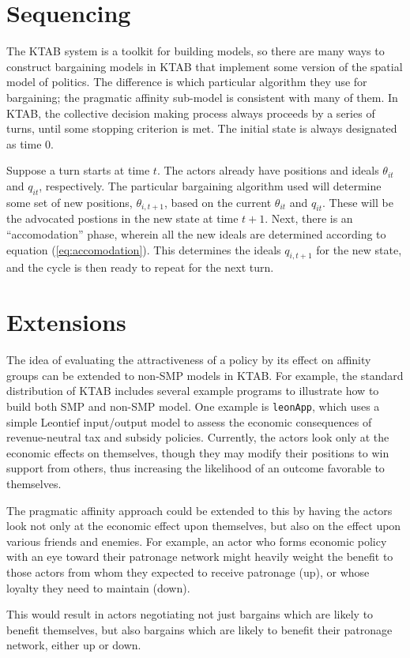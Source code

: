 \documentclass[a4paper,10pt]{article}
\begin{document}
\section{Sequencing}
The KTAB system is a toolkit for building models, so there are many ways to construct bargaining
models in KTAB that implement some version of the spatial model of politics. The difference is 
which particular algorithm they use for bargaining;
the pragmatic affinity sub-model is consistent with many of them. In KTAB,
the collective decision making process always proceeds by a series of turns, until some stopping
criterion is met. The initial state is always designated as time 0.

Suppose a turn starts at time $t$. The actors already have positions and ideals $\theta_{it}$
and $q_{it}$, respectively. The particular bargaining algorithm used will 
determine some set of new positions, $\theta_{i,t+1}$,
 based on the current  $\theta_{it}$
and $q_{it}$. These will be the advocated postions in the new state at time $t+1$.
Next, there is an ``accomodation'' phase, wherein all the new ideals are determined
according to equation (\ref{eq:accomodation}). This determines the ideals $q_{i,t+1}$ for the new state,
and the cycle is then ready to repeat for the next turn.

  
\section{Extensions}

The idea of evaluating the attractiveness of a policy by its effect on affinity groups can be extended to
non-SMP models in KTAB. For example, the standard distribution of KTAB includes several example programs
to illustrate how to build both SMP and non-SMP model. 
One example is \mbox{\texttt{leonApp}}, which  uses a simple Leontief input/output 
model to assess the economic consequences of revenue-neutral tax and subsidy policies.
Currently, the actors look only at the economic effects on themselves, though they may modify their positions
to win support from others, thus increasing the likelihood of an outcome favorable to themselves.

The pragmatic affinity approach could be extended to this by having the actors look not only at the economic 
effect upon themselves, but also on the effect upon various friends and enemies. For example, an actor
who forms economic policy with an eye toward their patronage network might heavily weight the benefit
to those actors from whom they expected to receive patronage (up),
or whose loyalty they need to maintain (down).

This would result in actors negotiating not just bargains which are likely to benefit
themselves, but also bargains which are likely to benefit their patronage network, either up or down.
 
\end{document}
